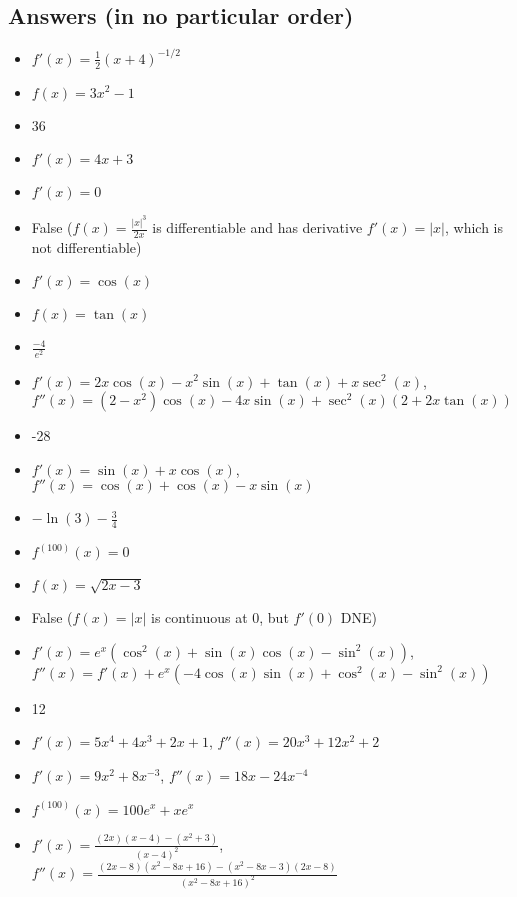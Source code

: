 \documentclass{article}
\begin{document}
\subsection*{Answers (in no particular order)}

\begin{itemize}
\item $f'(x)=\frac{1}{2}(x+4)^{-1/2}$
\item $f(x)=3x^2-1$
\item 36
\item $f'(x)=4x + 3$
\item $f'(x)=0$
\item False ($f(x)=\frac{\left|x\right|^{3}}{2x}$ is differentiable and has derivative $f'(x)=|x|$, which is not differentiable)
\item $f'(x)=\cos(x)$
\item $f(x)=\tan(x)$
\item $\frac{-4}{e^2}$
\item $f'(x)=2x\cos(x)-x^2\sin(x)+\tan(x)+x\sec^2(x)$, \\
$f''(x)=\left(2-x^{2}\right)\cos\left(x\right)-4x\sin\left(x\right)+\sec^{2}\left(x\right)\left(2+2x\tan\left(x\right)\right)$
\item -28
\item $f'(x)=\sin(x) + x\cos(x)$, $f''(x)=\cos(x) + \cos(x) -x\sin(x)$
\item $-\ln(3)-\frac34$
\item $f^{(100)}(x)=0$
\item $f(x)=\sqrt{2x-3}$
\item False ($f(x)=|x|$ is continuous at $0$, but $f'(0)$ DNE)
\item $f'(x)=e^{x}(\cos^{2}(x)+\sin(x)\cos(x)-\sin^{2}(x))$, \\$f''(x)=f'(x)+e^{x}\left(-4\cos\left(x\right)\sin\left(x\right)+\cos^{2}\left(x\right)-\sin^{2}\left(x\right)\right)$
\item 12
\item $f'(x)=5x^4+4x^3+2x+1$, $f''(x)=20x^3+12x^2+2$
\item $f'(x)=9x^2+8x^{-3}$, $f''(x)=18x-24x^{-4}$
\item $f^{(100)}(x)=100e^x+xe^x$
\item $f'(x)=\frac{(2x)(x-4)-(x^2+3)}{(x-4)^2}$, $f''(x)=\frac{(2x-8)(x^2-8x+16)-(x^2-8x-3)(2x-8)}{(x^2-8x+16)^2}$

\end{itemize}
\end{document}
